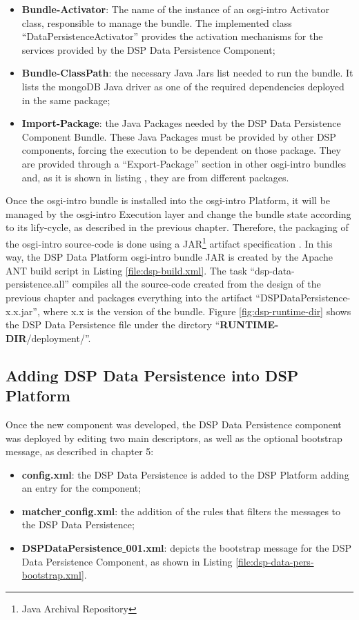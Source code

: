 \begin{itemize}
  \item \textbf{Bundle-Activator}: The name of the instance of an osgi-intro Activator
  class, responsible to manage the bundle. The implemented class
  ``DataPersistenceActivator'' provides the activation mechanisms for the
  services provided by the DSP Data Persistence Component;
  \item \textbf{Bundle-ClassPath}: the necessary Java Jars list needed to run
  the bundle. It lists the mongoDB Java driver as one of the required
  dependencies deployed in the same package;
  \item \textbf{Import-Package}: the Java Packages needed by the DSP Data
  Persistence Component Bundle. These Java Packages must be provided by other
  DSP components, forcing the execution to be dependent on those package.
  They are provided through a ``Export-Package'' section in other osgi-intro
  bundles and, as it is shown in listing \cite{file:osgi-intro-manifest}, they
  are from different packages.
\end{itemize}

Once the osgi-intro bundle is installed into the osgi-intro Platform, it will be managed by
the osgi-intro Execution layer and change the bundle state according to its
lify-cycle, as described in the previous chapter. Therefore, the packaging of
the osgi-intro source-code is done using a JAR\footnote{Java Archival Repository}
artifact specification \cite{java-tutorial}. In this way, the DSP Data
Platform osgi-intro bundle JAR is created by the Apache ANT build script
\cite{apache-ant} in Listing \ref{file:dsp-build.xml}. The task
``dsp-data-persistence.all'' compiles all the source-code created from the
design of the previous chapter and packages everything into the artifact
``DSPDataPersistence-x.x.jar'', where x.x is the version of the bundle. Figure
\ref{fig:dsp-runtime-dir} shows the DSP Data Persistence file under the
dirctory ``\textbf{RUNTIME-DIR}/deployment/''.

\subsection{Adding DSP Data Persistence into DSP Platform }

Once the new component was developed, the DSP Data Persistence component was
deployed by editing two main descriptors, as well as the optional bootstrap
message, as described in chapter 5:

\begin{itemize}
  \item \textbf{config.xml}: the DSP Data Persistence is added to the DSP
  Platform adding an entry for the component;
  \item \textbf{matcher\underline{ }config.xml}: the addition of the rules that
  filters the messages to the DSP Data Persistence;
  \item \textbf{DSPDataPersistence\underline{ }001.xml}: depicts the bootstrap
  message for the DSP Data Persistence Component, as shown in Listing 
  \ref{file:dsp-data-pers-bootstrap.xml}.
\end{itemize}

